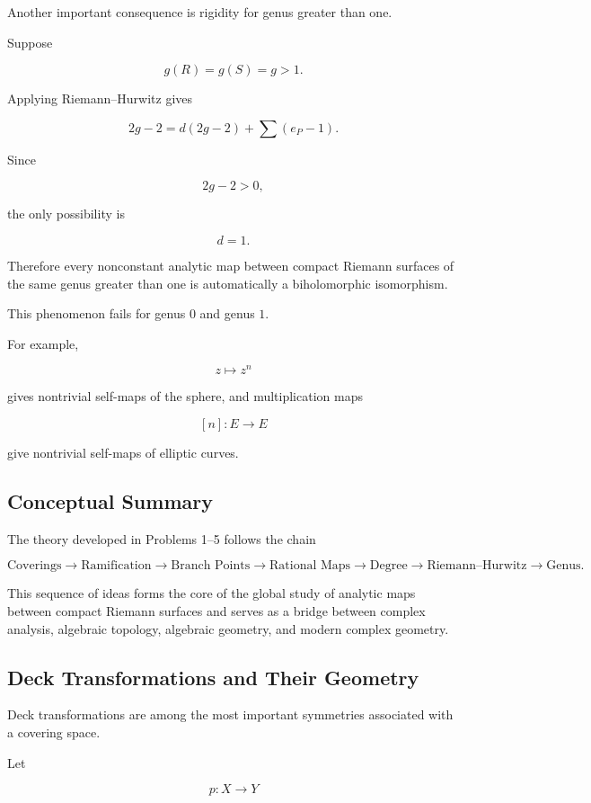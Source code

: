 \documentclass[12pt,a4paper]{article}
\theoremstyle{notespace}
\begin{document}
Another important consequence is rigidity for genus greater than one.

Suppose

\[
g(R)=g(S)=g>1.
\]

Applying Riemann--Hurwitz gives

\[
2g-2
=
d(2g-2)
+
\sum(e_P-1).
\]

Since

\[
2g-2>0,
\]

the only possibility is

\[
d=1.
\]

Therefore every nonconstant analytic map between compact Riemann surfaces of the same genus greater than one is automatically a biholomorphic isomorphism.

This phenomenon fails for genus \(0\) and genus \(1\).

For example,

\[
z\mapsto z^n
\]

gives nontrivial self-maps of the sphere, and multiplication maps

\[
[n]:E\to E
\]

give nontrivial self-maps of elliptic curves.

\subsection{Conceptual Summary}

The theory developed in Problems 1--5 follows the chain

\[
\text{Coverings}
\longrightarrow
\text{Ramification}
\longrightarrow
\text{Branch Points}
\longrightarrow
\text{Rational Maps}
\longrightarrow
\text{Degree}
\longrightarrow
\text{Riemann--Hurwitz}
\longrightarrow
\text{Genus}.
\]

This sequence of ideas forms the core of the global study of analytic maps between compact Riemann surfaces and serves as a bridge between complex analysis, algebraic topology, algebraic geometry, and modern complex geometry.

\subsection{Deck Transformations and Their Geometry}

Deck transformations are among the most important symmetries associated with a covering space.

Let

\[
p:X\to Y
\]
\end{document}
